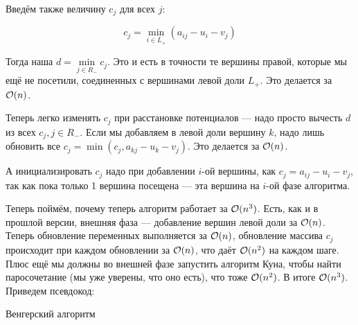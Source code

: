 \documentclass[a4paper, 12pt]{article}
\begin{document}
Введём также величину $c_j$ для всех $j$:

\[
  c_j = \min\limits_{i \in L_+} (a_{ij} - u_i - v_j)
\]

Тогда наша $d = \min\limits_{j \in R_-} c_j$. Это и есть в точности те вершины правой,
которые мы ещё не посетили, соединенных с вершинами левой доли $L_+$. Это делается
за $\mathcal{O}(n)$.

Теперь легко изменять $c_j$ при расстановке потенциалов --- надо просто вычесть
$d$ из всех $c_j, j \in R_-$. Если мы добавляем в левой доли вершину $k$, надо лишь
обновить все $c_j = \min(c_j, a_{kj} - u_k - v_j)$. Это делается за $\mathcal{O}(n)$.

А инициализировать $c_j$ надо
при добавлении $i$-ой вершины, как $c_j = a_{ij} - u_i - v_j$, так как пока
только 1 вершина посещена --- эта вершина на $i$-ой фазе алгоритма.

Теперь поймём, почему теперь алгоритм работает за $\mathcal{O}(n^3)$. Есть, как и в
прошлой версии, внешняя фаза --- добавление вершин левой доли за $\mathcal{O}(n)$. Теперь
обновление переменных выполняется за $\mathcal{O}(n)$, обновление массива $c_j$ происходит
при каждом обновлении за $\mathcal{O}(n)$, что даёт $\mathcal{O}(n^2)$ на каждом шаге. Плюс
ещё мы должны во внешней фазе запустить алгоритм Куна, чтобы найти паросочетание (мы
уже уверены, что оно есть), что тоже $\mathcal{O}(n^2)$. В итоге $\mathcal{O}(n^3)$. Приведем
псевдокод:

\begin{algorithm}
  \caption{Венгерский алгоритм}
    \begin{algorithmic}[1]
       
         
           
           
           
           
             
               
                 
                 
                 
              \Else
                 
                 
              \EndIf
            \EndIf
          \EndFor
        \EndWhile
      \EndFor
    \end{algorithmic}
\end{algorithm}
\end{document}

